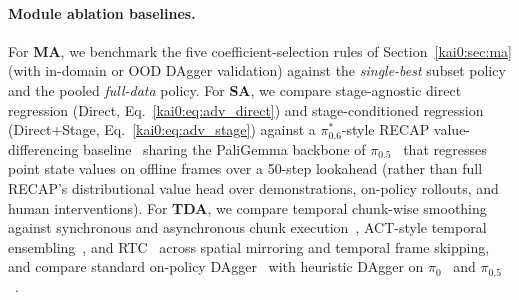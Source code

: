 \paragraph{Module ablation baselines.} For \textbf{MA}, we benchmark the five coefficient-selection rules of Section~\ref{kai0:sec:ma} (with in-domain or OOD DAgger validation) against the \emph{single-best} subset policy and the pooled \emph{full-data} policy. For \textbf{SA}, we compare stage-agnostic direct regression (Direct, Eq.~\eqref{kai0:eq:adv_direct}) and stage-conditioned regression (Direct+Stage, Eq.~\eqref{kai0:eq:adv_stage}) against a $\pi^{*}_{0.6}$-style RECAP value-differencing baseline~\cite{amin2026pistar06} sharing the PaliGemma backbone of $\pi_{0.5}$~\cite{black2025pi05} that regresses point state values on offline frames over a 50-step lookahead (rather than full RECAP's distributional value head over demonstrations, on-policy rollouts, and human interventions). For \textbf{TDA}, we compare temporal chunk-wise smoothing against synchronous and asynchronous chunk execution~\cite{tang2025vlash}, ACT-style temporal ensembling~\cite{zhao2023aloha}, and RTC~\cite{black2025rtc} across spatial mirroring and temporal frame skipping, and compare standard on-policy DAgger~\cite{ross2011dagger} with heuristic DAgger on $\pi_{0}$~\cite{black2024pi0} and $\pi_{0.5}$~\cite{black2025pi05}.

